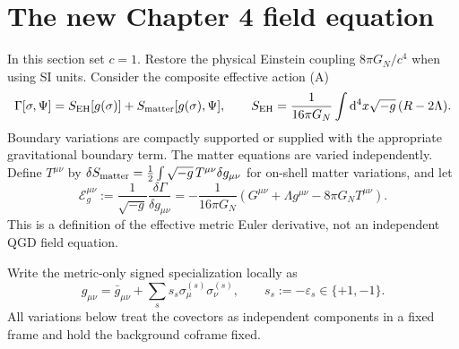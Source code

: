 \documentclass[11pt,a4paper]{article}
\newcommand{\dd}{\mathrm d}
\newcommand{\cE}{\mathcal E}
\begin{document}
\section{The new Chapter 4 field equation}
\label{sec:balance}
In this section set $c=1$. Restore the physical Einstein coupling
$8\pi G_N/c^4$ when using SI units. Consider the composite effective
action (A)
\begin{equation}\label{eq:action}
\Gamma[\sigma,\Psi]=S_{\rm EH}[g(\sigma)]
+S_{\rm matter}[g(\sigma),\Psi],\qquad
S_{\rm EH}=\frac{1}{16\pi G_N}
\int\dd^4x\sqrt{-g}\,(R-2\Lambda).
\end{equation}
Boundary variations are compactly supported or supplied with the
appropriate gravitational boundary term. The matter equations are
varied independently. Define $T^{\mu\nu}$ by
$\delta S_{\rm matter}=\frac12\int\sqrt{-g}\,
T^{\mu\nu}\delta g_{\mu\nu}$ for on-shell matter variations, and let
\begin{equation}\label{eq:Eg}
\boxed{\cE_g^{\mu\nu}:=\frac1{\sqrt{-g}}
\frac{\delta\Gamma}{\delta g_{\mu\nu}}
=-\frac{1}{16\pi G_N}
\left(G^{\mu\nu}+\Lambda g^{\mu\nu}
-8\pi G_N T^{\mu\nu}\right).}
\end{equation}
This is a definition of the effective metric Euler derivative,
not an independent QGD field equation.

Write the metric-only signed specialization locally as
\begin{equation}\label{eq:signed}
g_{\mu\nu}=\bar g_{\mu\nu}
+\sum_s s_s\sigma^{(s)}_\mu\sigma^{(s)}_\nu,
\qquad s_s:=-\varepsilon_s\in\{+1,-1\}.
\end{equation}
All variations below treat the covectors as independent components
in a fixed frame and hold the background coframe fixed.
\end{document}

